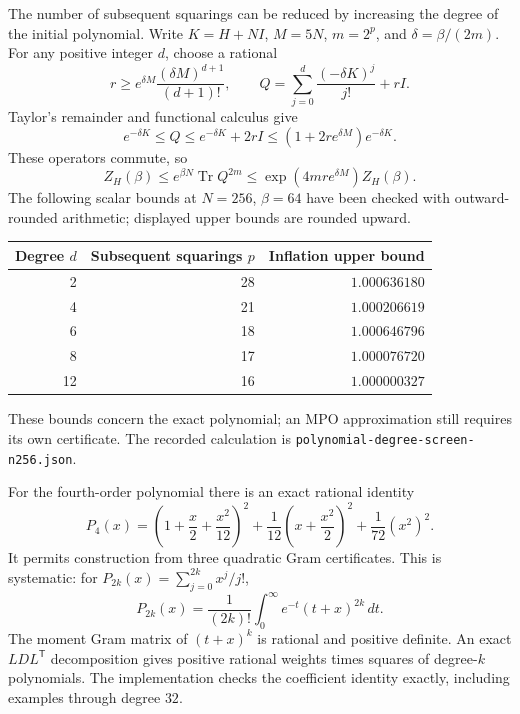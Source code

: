 \documentclass[11pt]{article}
\begin{document}
The number of subsequent squarings can be reduced by increasing the degree
of the initial polynomial. Write $K=H+NI$, $M=5N$, $m=2^p$, and
$\delta=\beta/(2m)$. For any positive integer $d$, choose a rational
\[
 r\ge e^{\delta M}\frac{(\delta M)^{d+1}}{(d+1)!},\qquad
 Q=\sum_{j=0}^d\frac{(-\delta K)^j}{j!}+rI.
\]
Taylor's remainder and functional calculus give
\[
 e^{-\delta K}\le Q\le e^{-\delta K}+2rI
 \le(1+2r e^{\delta M})e^{-\delta K}.
\]
These operators commute, so
\[
 Z_H(\beta)\le e^{\beta N}\operatorname{Tr}Q^{2m}
 \le \exp(4mr e^{\delta M})Z_H(\beta).
\]
The following scalar bounds at $N=256$, $\beta=64$ have been checked with
outward-rounded arithmetic; displayed upper bounds are rounded upward.
\begin{center}
\begin{tabular}{rrr}
\toprule
Degree $d$ & Subsequent squarings $p$ & Inflation upper bound\\
\midrule
2 & 28 & $1.000636180$\\
4 & 21 & $1.000206619$\\
6 & 18 & $1.000646796$\\
8 & 17 & $1.000076720$\\
12 & 16 & $1.000000327$\\
\bottomrule
\end{tabular}
\end{center}
These bounds concern the exact polynomial; an MPO approximation still
requires its own certificate. The recorded calculation is
\texttt{polynomial-degree-screen-n256.json}.

For the fourth-order polynomial there is an exact rational identity
\[
 P_4(x)=\left(1+\frac{x}{2}+\frac{x^2}{12}\right)^2
       +\frac1{12}\left(x+\frac{x^2}{2}\right)^2
       +\frac1{72}(x^2)^2.
\]
It permits construction from three quadratic Gram certificates. This is
systematic: for $P_{2k}(x)=\sum_{j=0}^{2k}x^j/j!$,
\[
 P_{2k}(x)=\frac1{(2k)!}\int_0^\infty e^{-t}(t+x)^{2k}\,dt.
\]
The moment Gram matrix of $(t+x)^k$ is rational and positive definite.
An exact $LDL^{\mathsf T}$ decomposition gives positive rational weights
times squares of degree-$k$ polynomials. The implementation checks the
coefficient identity exactly, including examples through degree $32$.
\end{document}
